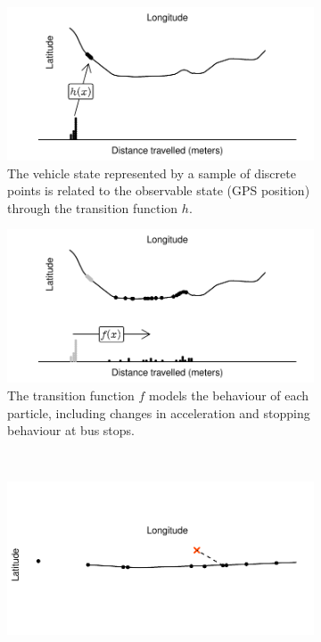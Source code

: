 \begin{figure}[tb]
    \centering
    \begin{subfigure}[t]{0.48\textwidth}
        \centering
        \includegraphics[width=\textwidth]{figures/03_particle_filter_1.pdf}
        \caption{The vehicle state represented by a sample of discrete points is related to the observable state (GPS position) through the transition function $h$.}
        \label{fig:pf_state_prev}
    \end{subfigure}\;\;
    \begin{subfigure}[t]{0.48\textwidth}
        \centering
        \includegraphics[width=\textwidth]{figures/03_particle_filter_2.pdf}
        \caption{The transition function $f$ models the behaviour of each particle,
            including changes in acceleration and stopping behaviour at bus stops.}
        \label{fig:pf_state_predict}
    \end{subfigure}\\
    \begin{subfigure}[t]{0.48\textwidth}
        \centering
        \includegraphics[width=\textwidth]{figures/03_particle_filter_6.pdf}

\end{subfigure}
\end{figure}
